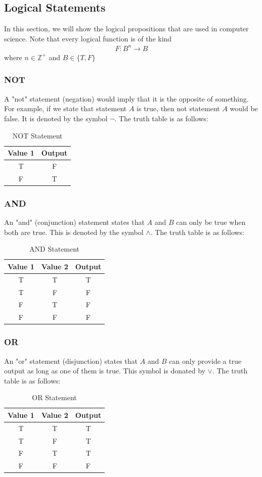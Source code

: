 \documentclass[a4paper]{article}
\theoremstyle{plain}
\theoremstyle{definition}
\theoremstyle{remark}
\begin{document}
\subsection{Logical Statements}
In this section, we will show the logical propositions that are used in computer science.
Note that every logical function is of the kind
\begin{align*}
	F:B^{n}\to B
\end{align*}
where $n \in \mathbb{Z}^{+}$ and $B \in \{T,F\}$
\subsubsection{NOT}
A "not" statement (negation) would imply that it is the opposite of something. For example, if we state that statement $A$ is true, then not statement $A$ would be false. It is denoted by the symbol $\neg$. The truth table is as follows:
\begin{table}[H]
	\centering
	\caption{NOT Statement}
	\label{tab:NOT}
	\begin{tabular}{cc}
		\hline
		Value 1 & Output \\
		\hline
		T & F \\
		F & T \\
		\hline
	\end{tabular}
\end{table}
\subsubsection{AND}
An "and" (conjunction) statement states that $A$ and $B$ can only be true when both are true. This is denoted by the symbol $\land$. The truth table is as follows:
\begin{table}[H]
	\centering
	\caption{AND Statement}
	\label{tab:AND}
	\begin{tabular}{ccc}
		\hline
		Value 1 & Value 2 & Output \\
		\hline
		T & T & T  \\
		T & F & F \\
		F & T & F \\
		F & F & F \\
		\hline
	\end{tabular}
\end{table}
\subsubsection{OR}
An "or" statement (disjunction) states that $A$ and $B$ can only provide a true output as long as one of them is true. This symbol is donated by $\lor$. The truth table is as follows:
\begin{table}[H]
	\centering
	\caption{OR Statement}
	\label{tab:OR}
	\begin{tabular}{ccc}
		\hline
		Value 1 & Value 2 & Output \\
		\hline
		T & T & T \\
		T & F & T \\
		F & T & T \\
		F & F & F \\
		\hline
	\end{tabular}
\end{table}
\end{document}
